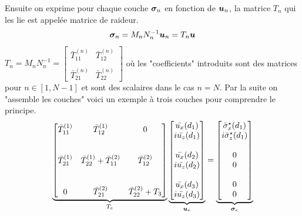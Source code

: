 Ensuite on exprime pour chaque couche $\bm{\sigma}_n$ en fonction de $\bm{u}_n$, la matrice $T_n$ qui les lie est appelée matrice de raideur.  
\begin{equation}
         \bm{\sigma}_n    = M_n N_n^{-1} \bm{u}_n = T_n \bm{u} 
\end{equation}
$T_n = M_n N_n^{-1} = \begin{bmatrix}
  \bar{T}_{11}^{(n)} & \bar{T}_{12}^{(n)} \\ \\
  \bar{T}_{21}^{(n)} & \bar{T}_{22}^{(n)}
\end{bmatrix} $ où les "coefficients" introduits sont des matrices pour $n\in[1,N-1]$ et sont des scalaires dans le cas $n=N$.
Par la suite on "assemble les couches" voici un exemple à trois couches pour comprendre le principe.
\begin{equation*}
    \underbrace{
    \begin{bmatrix}
         \bar{T}_{11}^{(1)} & \bar{T}_{12}^{(1)}                    & 0 \\ \\ \\
         \bar{T}_{21}^{(1)} & \bar{T}_{22}^{(1)}+\bar{T}_{11}^{(2)} & \bar{T}_{12}^{(2)}  \\ \\ \\
         0                  & \bar{T}_{21}^{(2)}                    & \bar{T}_{22}^{(2)}+ T_3 \\
    \end{bmatrix}
    }_{T_{e}}
    \underbrace{
    \begin{bmatrix}
         \bar{u_x}(d_1) \\ i\bar{u_z}(d_1) \\ \\  \bar{u_x}(d_2) \\ i\bar{u_z}(d_2)  \\ \\ \bar{u_x}(d_3) \\ i\bar{u_z}(d_3) 
    \end{bmatrix}}_{\bm{u}_e} = 
    \underbrace{
    \begin{bmatrix}
         \bar{\sigma}^\star_{x}(d_1) \\ i \bar{\sigma}^\star_{z}(d_1) \\ \\ 0 \\  0 \\ \\ 0 \\ 0
    \end{bmatrix}}_{\bm{\sigma}_e}
\end{equation*}

